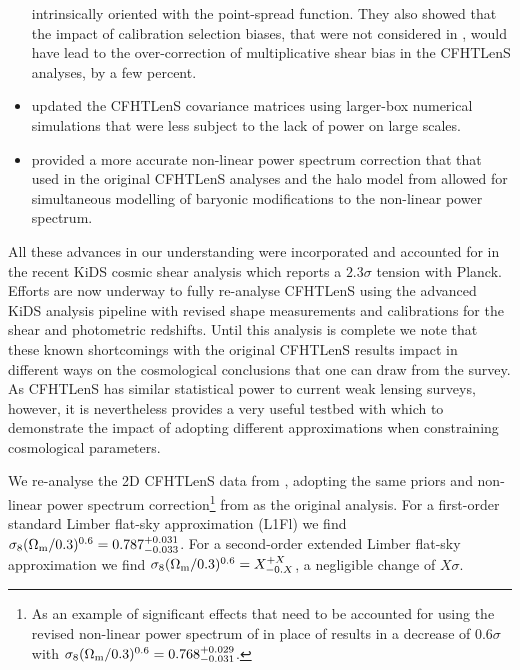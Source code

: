 \begin{itemize}
{intrinsically oriented with the point-spread function.  They also showed that
the impact of calibration selection biases, that were not considered in
\citet{miller/etal:2013}, would have lead to the over-correction of
multiplicative shear bias in the CFHTLenS analyses, by a few percent.}
%
\item{\citet{joudaki/etal:2016} updated the CFHTLenS covariance matrices using larger-box numerical simulations that were less subject to the lack of power on large scales.}
\item{\cite{2012ApJ...761..152T} provided a more accurate non-linear power
spectrum correction that that used in the original CFHTLenS analyses and the
halo model from \cite{2015MNRAS.454.1958M} allowed for simultaneous modelling
of baryonic modifications to the non-linear power spectrum.} 
%
\end{itemize}
%
All these advances in our understanding were incorporated and accounted for in
the recent KiDS cosmic shear analysis \citep{KiDS-450} which reports a $2.3
\sigma$ tension with Planck.  Efforts are now underway to fully re-analyse
CFHTLenS using the advanced KiDS analysis pipeline with revised shape
measurements and calibrations for the shear and photometric redshifts.  Until
this analysis is complete we note that these known shortcomings with the
original CFHTLenS results impact in different ways on the cosmological
conclusions that one can draw from the survey.  As CFHTLenS has similar
statistical power to current weak lensing surveys, however, it is nevertheless
provides a very useful testbed with which to demonstrate the impact of adopting
different approximations when constraining cosmological parameters.

We re-analyse the 2D CFHTLenS data from \cite{CFHTLenS-2pt-notomo}, adopting the same priors and non-linear power spectrum correction\footnote{As an example of significant effects that need to be accounted for using the revised non-linear power spectrum of \cite{2012ApJ...761..152T} in place of \cite{2003MNRAS.341.1311S} results in a decrease of $0.6 \sigma$ with $\sigma_8 (\Omega_{\rm m}/0.3)^{0.6} =0.768^{+0.029}_{-0.031}$.} from \cite{2003MNRAS.341.1311S} as the original \cite{CFHTLenS-2pt-notomo} analysis.  For a first-order standard Limber flat-sky approximation (L1Fl) we find $\sigma_8 (\Omega_{\rm m}/0.3)^{0.6} =0.787^{+0.031}_{-0.033}$.   For a second-order extended Limber flat-sky approximation we find $\sigma_8 (\Omega_{\rm m}/0.3)^{0.6} =X^{+X}_{-0.X}$, a negligible change of $X\sigma$. 

